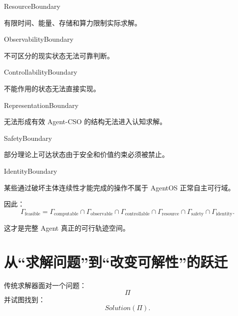 \begin{statementbox}
ResourceBoundary
\end{statementbox}

有限时间、能量、存储和算力限制实际求解。

\begin{statementbox}
ObservabilityBoundary
\end{statementbox}

不可区分的现实状态无法可靠判断。

\begin{statementbox}
ControllabilityBoundary
\end{statementbox}

不能作用的状态无法直接实现。

\begin{statementbox}
RepresentationBoundary
\end{statementbox}

无法形成有效 Agent-CSO 的结构无法进入认知求解。

\begin{statementbox}
SafetyBoundary
\end{statementbox}

部分理论上可达状态由于安全和价值约束必须被禁止。

\begin{statementbox}
IdentityBoundary
\end{statementbox}

某些通过破坏主体连续性才能完成的操作不属于 AgentOS 正常自主可行域。

因此：
\begin{equation}
\Gamma_{\mathrm{feasible}}
=
\Gamma_{\mathrm{computable}}
\cap
\Gamma_{\mathrm{observable}}
\cap
\Gamma_{\mathrm{controllable}}
\cap
\Gamma_{\mathrm{resource}}
\cap
\Gamma_{\mathrm{safety}}
\cap
\Gamma_{\mathrm{identity}}.
\end{equation}

这才是完整 Agent 真正的可行轨迹空间。

\section{从“求解问题”到“改变可解性”的跃迁}

传统求解器面对一个问题：
\begin{equation}
\Pi
\end{equation}
并试图找到：
\begin{equation}
Solution(\Pi).
\end{equation}

